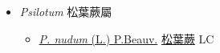 
  \begin{itemize}
 \item[] \textit{Psilotum} 松葉蕨屬
                    
  \begin{itemize}
        \item[] \href{http://www.theplantlist.org/tpl1.1/search?q=Psilotum+nudum}{\textit{P. nudum} (L.) P.Beauv.}   \href{\detokenize{http://taibnet.sinica.edu.tw/chi/taibnet_species_list.php?T2=松葉蕨&T2_new_value=true&fr=y}}{松葉蕨} LC
  \end{itemize}
  \end{itemize}
